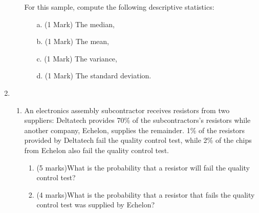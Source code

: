 \documentclass[a4paper,12pt]{article}
\begin{document}
\begin{enumerate}
\begin{enumerate}
\begin{table}[ht]
\begin{center}
\begin{tabular}{|rrrrrrr|}
\hline
\end{tabular}
\end{center}
\end{table}
\vspace{-0.5cm}
\noindent For this sample, compute the following descriptive statistics:
\begin{itemize}
\item[a.] (1 Mark) The median,
\item[b.] (1 Mark) The mean,
\item[c.] (1 Mark) The variance,
\item[d.] (1 Mark) The standard deviation.
\end{itemize}

%
%


\end{enumerate}
\newpage
\item
\begin{enumerate}

\item An electronics assembly subcontractor receives resistors from two suppliers: Deltatech provides
70\% of the subcontractors's resistors while another company, Echelon, supplies the remainder.
1\% of the resistors provided by Deltatech fail the quality control test, while 2\% of the
chips from Echelon also fail the quality control test.

\begin{enumerate}
\item (5 marks)What is the probability that a resistor will fail the quality control test?


\item (4 marks)What is the probability that a resistor that fails the quality control test was supplied by Echelon?
\end{enumerate}



\end{enumerate}
\end{enumerate}
\end{document}
